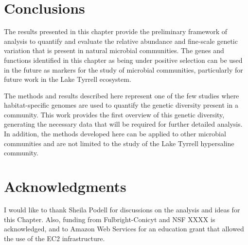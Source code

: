 \section{Conclusions}

The results presented in this chapter provide the preliminary framework of analysis to quantify and evaluate the relative abundance and fine-scale genetic variation that is present in natural microbial communities. The genes and functions identified in this chapter as being under positive selection can be used in the future as markers for the study of microbial communities, particularly for future work in the Lake Tyrrell ecosystem.

The methods and results described here represent one of the few studies where habitat-specific genomes are used to quantify the genetic diversity present in a community. This work provides the first overview of this genetic diversity, generating the necessary data that will be required for further detailed analysis. In addition, the methods developed here can be applied to other microbial communities and are not limited to the study of the Lake Tyrrell hypersaline community.

\section{Acknowledgments}
I would like to thank Sheila Podell for discussions on the analysis and ideas for this Chapter. Also, funding from Fulbright-Conicyt and NSF XXXX is acknowledged, and to Amazon Web Services for an education grant that allowed the use of the EC2 infrastructure.







